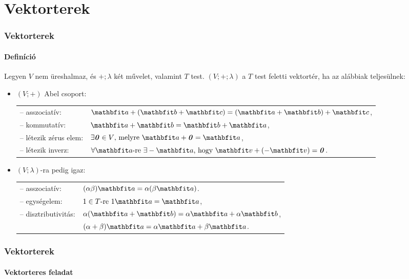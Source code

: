 \section{Vektorterek}
\begin{frame}
  \frametitle{Vektorterek}
  \framesubtitle{Definíció}

  Legyen $V$ nem üreshalmaz, és $+; \lambda$ két művelet, valamint $T$ test.
  $(V; +; \lambda)$ a $T$ test feletti vektortér, ha az alábbiak teljesülnek:
  \begin{itemize}
    \def\arraystretch{1.2}
    \item $(V; +)$ Abel csoport:\\[1mm]
          \begin{tabular}{p{35mm} l}
            -- asszociatív:        &
            $\rvec a + (\rvec b + \rvec c) = (\rvec a + \rvec b) + \rvec c$,
            \\
            -- kommutatív:         &
            $\rvec a + \rvec b = \rvec b + \rvec a$,
            \\
            -- létezik zérus elem: &
            $\exists \nvec \in V \text{, melyre } \rvec a + \nvec = \rvec a$,
            \\
            -- létezik inverz:     &
            $\forall \rvec a \text{-re } \exists - \rvec a \text{, hogy } \rvec v + (- \rvec v) = \nvec$.
          \end{tabular}
    \item $(V; \lambda)$-ra pedig igaz:\\[1mm]
          \begin{tabular}{p{35mm} l}
            -- asszociatív:      & $(\alpha \beta) \rvec a = \alpha (\beta \rvec a)$.
            \\
            -- egységelem:       & $1 \in T \text{-re } 1\rvec a = \rvec a$,
            \\
            -- disztributivitás: & $\alpha(\rvec a + \rvec b) = \alpha \rvec a + \alpha \rvec b$,
            \\
                                 & $(\alpha + \beta) \rvec a = \alpha \rvec a + \beta \rvec a$.
          \end{tabular}
  \end{itemize}
\end{frame}

\begin{frame}
  \frametitle{Vektorterek}
  \framesubtitle{Vektorteres feladat}

  
\end{frame}

